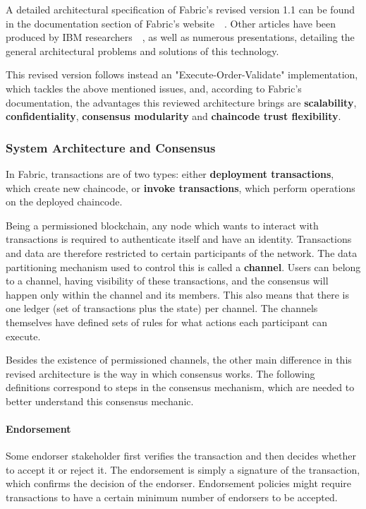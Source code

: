 A detailed architectural specification of Fabric's revised version 1.1 can be found in the documentation section of Fabric's website~\cite{FabricDocArch}~\cite{IBMResearch2017}. Other articles have been produced by IBM researchers~\cite{Cachin2016}~\cite{Vukolic2017}, as well as numerous presentations, detailing the general architectural problems and solutions of this technology.

This revised version follows instead an "Execute-Order-Validate" implementation, which tackles the above mentioned issues, and, according to Fabric's documentation, the advantages this reviewed architecture brings are \textbf{scalability}, \textbf{confidentiality}, \textbf{consensus modularity} and \textbf{chaincode trust flexibility}.

\subsubsection{System Architecture and Consensus}
\label{hyperledger_architecture}
In Fabric, transactions are of two types: either \textbf{deployment transactions}, which create new chaincode, or \textbf{invoke transactions}, which perform operations on the deployed chaincode. 

Being a permissioned blockchain, any node which wants to interact with transactions is required to authenticate itself and have an identity. Transactions and data are therefore restricted to certain participants of the network. The data partitioning mechanism used to control this is called a \textbf{channel}. Users can belong to a channel, having visibility of these transactions, and the consensus will happen only within the channel and its members. This also means that there is one ledger (set of transactions plus the state) per channel. The channels themselves have defined sets of rules for what actions each participant can execute.

Besides the existence of permissioned channels, the other main difference in this revised architecture is the way in which consensus works. The following definitions correspond to steps in the consensus mechanism, which are needed to better understand this consensus mechanic.

\paragraph{Endorsement} Some endorser stakeholder first verifies the transaction and then decides whether to accept it or reject it. The endorsement is simply a signature of the transaction, which confirms the decision of the endorser. Endorsement policies might require transactions to have a certain minimum number of endorsers to be accepted.


